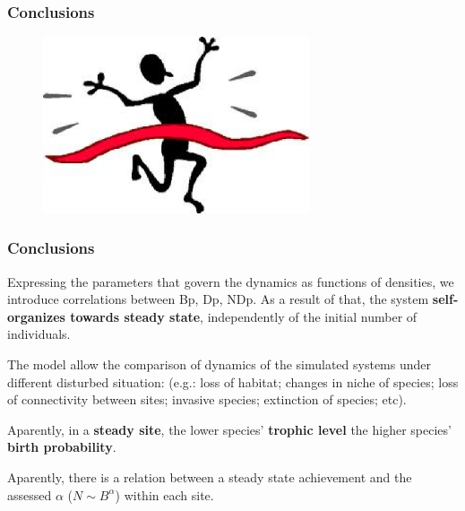 \documentclass[xcolor=x11names,compress]{beamer}
\renewcommand{\(}{\begin{columns}}
\renewcommand{\)}{\end{columns}}
\newcommand{\<}[1]{\begin{column}{#1}}
\renewcommand{\>}{\end{column}}
\begin{document}
\begin{frame}
\frametitle{Conclusions}
   \begin{figure}
	\includegraphics[width=0.7\textwidth]{./conclusion.eps}
   \end{figure}
\end{frame}

\begin{frame}
\frametitle{Conclusions}

\begin{block}{}
Expressing the parameters that govern the dynamics as functions of densities, we introduce correlations between Bp, Dp, NDp. As a result of that, the system \textbf{self-organizes towards steady state}, independently of the initial number of individuals. 
\end{block}
\pause

\begin{block}{}
The model allow the comparison of dynamics of the simulated systems under different disturbed situation: (e.g.: loss of habitat; changes in niche of species; loss of connectivity between sites; invasive species; extinction of species; etc). 
\end{block}
\pause

\begin{block}{}
Aparently, in a \textbf{steady site}, the lower species' \textbf{trophic level} the higher species' \textbf{birth probability}.
\end{block}
\pause

\begin{block}{}
Aparently, there is a relation between a steady state achievement and the assessed $\alpha$ ($N \sim B^{\alpha}$) within each site. 
\end{block}
\pause

\end{frame}
\end{document}
